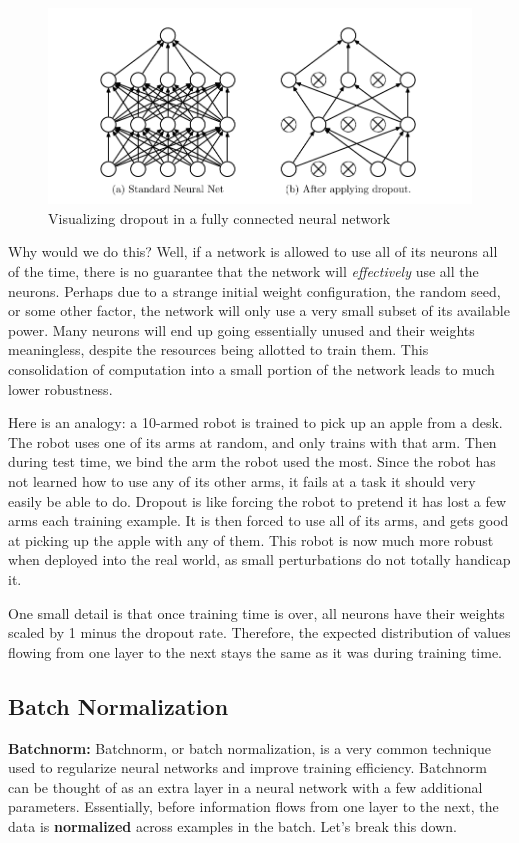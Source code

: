    \begin{figure}[H]
        \centering
        \includegraphics[width=1\linewidth]{dl/dropout.png}
        \caption{Visualizing dropout in a fully connected neural network}
        \label{fig:dropout}
    \end{figure}

    Why would we do this? Well, if a network is allowed to use all of its neurons all of the time, there is no guarantee that the network will \textit{effectively} use all the neurons. Perhaps due to a strange initial weight configuration, the random seed, or some other factor, the network will only use a very small subset of its available power. Many neurons will end up going essentially unused and their weights meaningless, despite the resources being allotted to train them. This consolidation of computation into a small portion of the network leads to much lower robustness. 
    
    Here is an analogy: a 10-armed robot is trained to pick up an apple from a desk. The robot uses one of its arms at random, and only trains with that arm. Then during test time, we bind the arm the robot used the most. Since the robot has not learned how to use any of its other arms, it fails at a task it should very easily be able to do. Dropout is like forcing the robot to pretend it has lost a few arms each training example. It is then forced to use all of its arms, and gets good at picking up the apple with any of them. This robot is now much more robust when deployed into the real world, as small perturbations do not totally handicap it. 

    One small detail is that once training time is over, all neurons have their weights scaled by 1 minus the dropout rate. Therefore, the expected distribution of values flowing from one layer to the next stays the same as it was during training time.

\subsection{Batch Normalization}
    \large \textbf{Batchnorm:} Batchnorm, or batch normalization, is a very common technique used to regularize neural networks and improve training efficiency. Batchnorm can be thought of as an extra layer in a neural network with a few additional parameters. Essentially, before information flows from one layer to the next, the data is \textbf{normalized} across examples in the batch. Let's break this down. 
    
